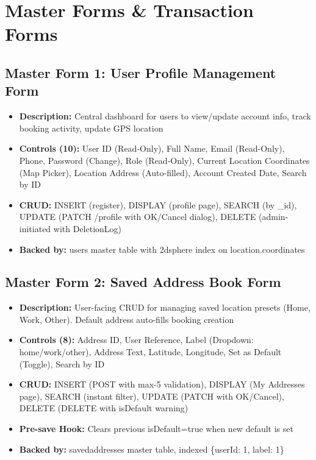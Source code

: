 \documentclass[12pt,a4paper]{article}
\begin{document}
\section*{Master Forms \& Transaction Forms}

\subsection*{Master Form 1: User Profile Management Form}
\begin{itemize}[leftmargin=*]
    \item \textbf{Description:} Central dashboard for users to view/update account info, track booking activity, update GPS location
    \item \textbf{Controls (10):} User ID (Read-Only), Full Name, Email (Read-Only), Phone, Password (Change), Role (Read-Only), Current Location Coordinates (Map Picker), Location Address (Auto-filled), Account Created Date, Search by ID
    \item \textbf{CRUD:} INSERT (register), DISPLAY (profile page), SEARCH (by \_id), UPDATE (PATCH /profile with OK/Cancel dialog), DELETE (admin-initiated with DeletionLog)
    \item \textbf{Backed by:} users master table with 2dsphere index on location.coordinates
\end{itemize}

\subsection*{Master Form 2: Saved Address Book Form}
\begin{itemize}[leftmargin=*]
    \item \textbf{Description:} User-facing CRUD for managing saved location presets (Home, Work, Other). Default address auto-fills booking creation
    \item \textbf{Controls (8):} Address ID, User Reference, Label (Dropdown: home/work/other), Address Text, Latitude, Longitude, Set as Default (Toggle), Search by ID
    \item \textbf{CRUD:} INSERT (POST with max-5 validation), DISPLAY (My Addresses page), SEARCH (instant filter), UPDATE (PATCH with OK/Cancel), DELETE (DELETE with isDefault warning)
    \item \textbf{Pre-save Hook:} Clears previous isDefault=true when new default is set
    \item \textbf{Backed by:} savedaddresses master table, indexed \{userId: 1, label: 1\}
\end{itemize}
\end{document}
